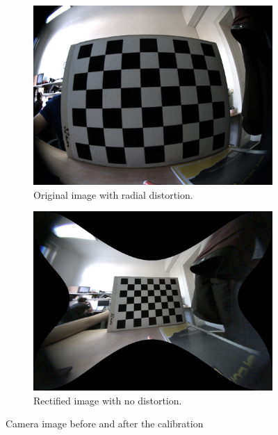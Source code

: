 \begin{figure}[h]
    \begin{subfigure}[b]{0.45\textwidth}
      \includegraphics[width=\textwidth]{graphics/chessboard_img.png}
      \caption{Original image with radial distortion.}
      \label{fig:chb1}
    \end{subfigure}
    \hfill
    \begin{subfigure}[b]{0.45\textwidth}
      \includegraphics[width=\textwidth]{graphics/chessboard_img_rect.png}
      \caption{Rectified image with no distortion.}
      \label{fig:chb2}
    \end{subfigure}
    \caption{Camera image before and after the calibration}
    \label{fig:chb}
\end{figure}

